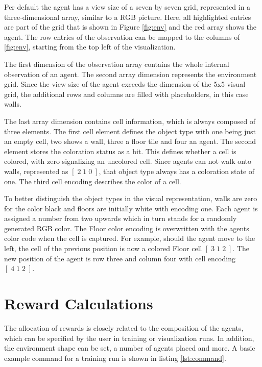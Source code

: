 Per default the agent has a view size of a seven by seven grid, represented in a three-dimensional array, similar to a RGB picture. Here, all highlighted entries are part of the grid that is shown in Figure \ref{fig:env} and the red array shows the agent. The row entries of the observation can be mapped to the columns of \ref{fig:env}, starting from the top left of the visualization. 

The first dimension of the observation array contains the whole internal observation of an agent. The second array dimension represents the environment grid. Since the view size of the agent exceeds the dimension of the 5x5 visual grid, the additional rows and columns are filled with placeholders, in this case walls.


The last array dimension contains cell information, which is always composed of three elements. The first cell element defines the object type with one being just an empty cell, two shows a wall, three a floor tile and four an agent. The second element stores the coloration status as a bit. This defines whether a cell is colored, with zero signalizing an uncolored cell. Since agents can not walk onto walls, represented as $[\;2\;1\;0\;]$, that object type always has a coloration state of one. The third cell encoding describes the color of a cell. 

To better distinguish the object types in the visual representation, walls are zero for the color black and floors are initially white with encoding one. Each agent is assigned a number from two upwards which in turn stands for a randomly generated RGB color. The Floor color encoding is overwritten with the agents color code when the cell is captured. For example, should the agent move to the left, the cell of the previous position is now a colored Floor cell $[\;3\;1\;2\;]$. The new position of the agent is row three and column four with cell encoding $[\;4\;1\;2\;]$.

\section{Reward Calculations}\label{reward_calculations}
The allocation of rewards is closely related to the composition of the agents, which can be specified by the user in training or visualization runs. In addition, the environment shape can be set, a number of agents placed and more. A basic example command for a training run is shown in listing \ref{lst:command}.

